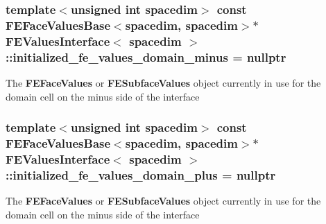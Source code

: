 \subsubsection[{\texorpdfstring{initialized\+\_\+fe\+\_\+values\+\_\+domain\+\_\+minus}{initialized_fe_values_domain_minus}}]{\setlength{\rightskip}{0pt plus 5cm}template$<$unsigned int spacedim$>$ const {\bf F\+E\+Face\+Values\+Base}$<$spacedim, spacedim$>$$\ast$ {\bf F\+E\+Values\+Interface}$<$ spacedim $>$\+::initialized\+\_\+fe\+\_\+values\+\_\+domain\+\_\+minus = nullptr\hspace{0.3cm}{\ttfamily [private]}}\hypertarget{class_f_e_values_interface_a48f1a887c14615d665408f156d879980}{}\label{class_f_e_values_interface_a48f1a887c14615d665408f156d879980}
The {\bf F\+E\+Face\+Values} or {\bf F\+E\+Subface\+Values} object currently in use for the domain cell on the minus side of the interface 
\subsubsection[{\texorpdfstring{initialized\+\_\+fe\+\_\+values\+\_\+domain\+\_\+plus}{initialized_fe_values_domain_plus}}]{\setlength{\rightskip}{0pt plus 5cm}template$<$unsigned int spacedim$>$ const {\bf F\+E\+Face\+Values\+Base}$<$spacedim, spacedim$>$$\ast$ {\bf F\+E\+Values\+Interface}$<$ spacedim $>$\+::initialized\+\_\+fe\+\_\+values\+\_\+domain\+\_\+plus = nullptr\hspace{0.3cm}{\ttfamily [private]}}\hypertarget{class_f_e_values_interface_ab1f7524d517a79cd5e4adbd43017f415}{}\label{class_f_e_values_interface_ab1f7524d517a79cd5e4adbd43017f415}
The {\bf F\+E\+Face\+Values} or {\bf F\+E\+Subface\+Values} object currently in use for the domain cell on the minus side of the interface 
